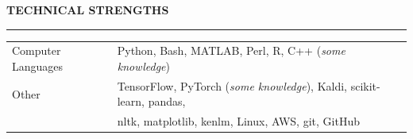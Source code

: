 \documentclass{resume} %
\begin{document}







\vspace{.5cm}
\begin{minipage}{\textwidth}
\sectionskip
\MakeUppercase{\textbf{Technical Strengths}}
  \sectionlineskip
  \hrule
\vspace{.5cm}

\begin{tabular}{ll}
Computer Languages & Python, Bash, MATLAB, Perl, R, C++ (\textit{some knowledge}) \\
Other & TensorFlow, PyTorch (\textit{some knowledge}), Kaldi, scikit-learn, pandas,\\
& nltk, matplotlib, kenlm, Linux, AWS, git, GitHub \\
\end{tabular}
\end{minipage}
\end{document}
